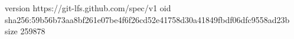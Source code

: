version https://git-lfs.github.com/spec/v1
oid sha256:59b56b73aa8bf261e07be4f6f26cd52e41758d30a41849fbdf06dfc9558ad23b
size 259878
